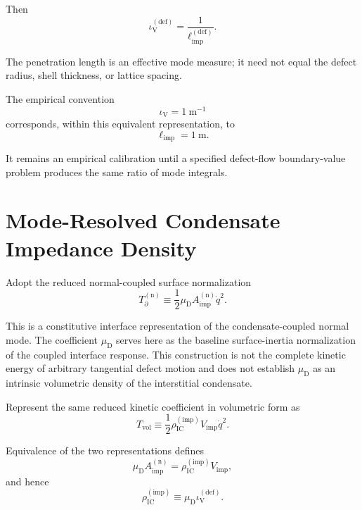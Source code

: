 Then
\begin{equation}
    \iota_{\mathrm{V}}^{(\mathrm{def})}=\frac{1}{\ell_{\mathrm{imp}}^{(\mathrm{def})}}.
\end{equation}

The penetration length is an effective mode measure; it need not equal the defect radius, shell thickness, or lattice spacing.

The empirical convention
\begin{equation}
    \iota_{\mathrm{V}}=1\ \mathrm{m}^{-1}
\end{equation}
corresponds, within this equivalent representation, to
\begin{equation}
    \ell_{\mathrm{imp}}=1\ \mathrm{m}.
\end{equation}

It remains an empirical calibration until a specified defect-flow boundary-value problem produces the same ratio of mode integrals.

\section{Mode-Resolved Condensate Impedance Density}
\label{sec:AP_mode_resolved_density}

Adopt the reduced normal-coupled surface normalization
\begin{equation}
    T_{\partial}^{(\mathrm{n})}\equiv\frac{1}{2}\mu_{\mathrm{D}}A_{\mathrm{imp}}^{(\mathrm{n})}\dot{q}^{2}.
\end{equation}

This is a constitutive interface representation of the condensate-coupled normal mode. The coefficient $\mu_{\mathrm{D}}$ serves here as the baseline surface-inertia normalization of the coupled interface response. This construction is not the complete kinetic energy of arbitrary tangential defect motion and does not establish $\mu_{\mathrm{D}}$ as an intrinsic volumetric density of the interstitial condensate.

Represent the same reduced kinetic coefficient in volumetric form as
\begin{equation}
    T_{\mathrm{vol}}\equiv\frac{1}{2}\rho_{\mathrm{IC}}^{(\mathrm{imp})}V_{\mathrm{imp}}\dot{q}^{2}.
\end{equation}

Equivalence of the two representations defines
\begin{equation}
    \mu_{\mathrm{D}}A_{\mathrm{imp}}^{(\mathrm{n})}=\rho_{\mathrm{IC}}^{(\mathrm{imp})}V_{\mathrm{imp}},
\end{equation}
and hence
\begin{equation}
    \rho_{\mathrm{IC}}^{(\mathrm{imp})}\equiv\mu_{\mathrm{D}}\iota_{\mathrm{V}}^{(\mathrm{def})}.
\end{equation}

